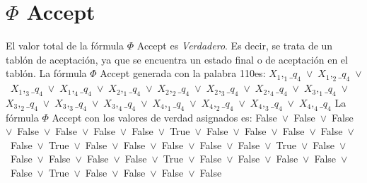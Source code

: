 ﻿\documentclass[a4paper,10pt]{article}
\begin{document}
\section{$\Phi$ Accept}
El valor total de la fórmula $\Phi$ Accept es \emph{Verdadero}. Es decir, se trata de un tablón de aceptación, ya que se encuentra un estado final o de aceptación en el tablón. \newline \newline 
La fórmula $\Phi$ Accept generada con la palabra 110es: \newline \newline 
$X_1,_1\_q_4$\ $\vee$\ $X_1,_2\_q_4$\ $\vee$\ $X_1,_3\_q_4$\ $\vee$\ $X_1,_4\_q_4$\ $\vee$\ $X_2,_1\_q_4$\ $\vee$\ $X_2,_2\_q_4$\ $\vee$\ $X_2,_3\_q_4$\ $\vee$\ $X_2,_4\_q_4$\ $\vee$\ $X_3,_1\_q_4$\ $\vee$\ $X_3,_2\_q_4$\ $\vee$\ $X_3,_3\_q_4$\ $\vee$\ $X_3,_4\_q_4$\ $\vee$\ $X_4,_1\_q_4$\ $\vee$\ $X_4,_2\_q_4$\ $\vee$\ $X_4,_3\_q_4$\ $\vee$\ $X_4,_4\_q_4$ \newline \newline 
La fórmula $\Phi$ Accept con los valores de verdad asignados es: \newline \newline 
False\ $\vee$\ False\ $\vee$\ False\ $\vee$\ False\ $\vee$\ False\ $\vee$\ False\ $\vee$\ False\ $\vee$\ True\ $\vee$\ False\ $\vee$\ False\ $\vee$\ False\ $\vee$\ False\ $\vee$\ False\ $\vee$\ True\ $\vee$\ False\ $\vee$\ False\ $\vee$\ False\ $\vee$\ False\ $\vee$\ False\ $\vee$\ True\ $\vee$\ False\ $\vee$\ False\ $\vee$\ False\ $\vee$\ False\ $\vee$\ False\ $\vee$\ True\ $\vee$\ False\ $\vee$\ False\ $\vee$\ False\ $\vee$\ False\ $\vee$\ False\ $\vee$\ True\ $\vee$\ False\ $\vee$\ False\ $\vee$\ False\ $\vee$\ False\  \newline \newline 
\end{document}
